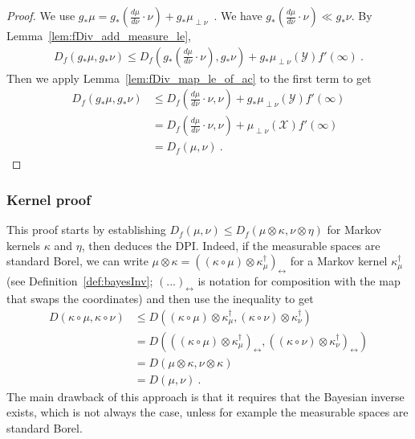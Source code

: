 \begin{proof}%
{}
We use $g_*\mu = g_*(\frac{d\mu}{d\nu}\cdot \nu) + g_*\mu_{\perp \nu}$~. 
We have $g_*(\frac{d\mu}{d\nu}\cdot \nu) \ll g_*\nu$.
By Lemma~\ref{lem:fDiv_add_measure_le},
\begin{align*}
D_f(g_* \mu, g_* \nu)
\le D_f\left(g_*(\frac{d\mu}{d\nu}\cdot \nu), g_*\nu\right)
  + g_*\mu_{\perp \nu}(\mathcal Y) f'(\infty)
\: .
\end{align*}
Then we apply Lemma~\ref{lem:fDiv_map_le_of_ac} to the first term to get
\begin{align*}
D_f(g_* \mu, g_* \nu)
&\le D_f\left(\frac{d\mu}{d\nu}\cdot \nu, \nu\right)
  + g_*\mu_{\perp \nu}(\mathcal Y) f'(\infty)
\\
&= D_f\left(\frac{d\mu}{d\nu}\cdot \nu, \nu\right)
  + \mu_{\perp \nu}(\mathcal X) f'(\infty)
\\
&= D_f(\mu, \nu)
\: .
\end{align*}
\end{proof}


\subsubsection{Kernel proof}

This proof starts by establishing $D_f(\mu, \nu) \le D_f(\mu \otimes \kappa, \nu \otimes \eta)$ for Markov kernels $\kappa$ and $\eta$, then deduces the DPI.
Indeed, if the measurable spaces are standard Borel, we can write $\mu \otimes \kappa = ((\kappa \circ \mu) \otimes \kappa^\dagger_\mu)_\leftrightarrow$ for a Markov kernel $\kappa^\dagger_\mu$ (see Definition~\ref{def:bayesInv}; $(...)_\leftrightarrow$ is notation for composition with the map that swaps the coordinates) and then use the inequality to get
\begin{align*}
D(\kappa \circ \mu, \kappa \circ \nu)
&\le D((\kappa \circ \mu) \otimes \kappa^\dagger_\mu, (\kappa \circ \nu) \otimes \kappa^\dagger_\nu)
\\
&= D(((\kappa \circ \mu) \otimes \kappa^\dagger_\mu)_{\leftrightarrow}, ((\kappa \circ \nu) \otimes \kappa^\dagger_\nu)_{\leftrightarrow})
\\
&= D(\mu \otimes \kappa, \nu \otimes \kappa)
\\
&= D(\mu, \nu)
\: .
\end{align*}
The main drawback of this approach is that it requires that the Bayesian inverse exists, which is not always the case, unless for example the measurable spaces are standard Borel.

